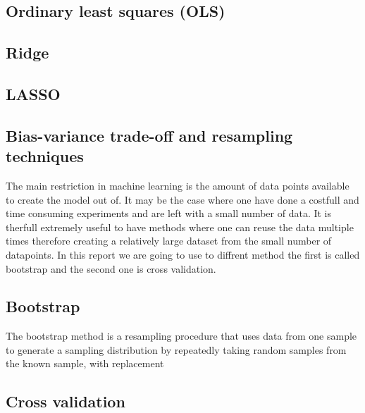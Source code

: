 \thispagestyle{plain}

\subsection{Ordinary least squares (OLS)}
\subsection{Ridge}
\subsection{LASSO}


\subsection{Bias-variance trade-off and resampling techniques}

\noindent The main restriction in machine learning is 
the amount of data points available to create the model out of. It may be the case where one have
done a costfull and time consuming experiments and are left with a small number of data. 
It is therfull extremely useful to have methods where one can reuse the data multiple times
therefore creating a relatively large dataset from the small number of datapoints. In this report
we are going to use to diffrent method the first is called bootstrap and the second one is cross validation.

\subsection{Bootstrap} 
\noindent The bootstrap method is a resampling procedure that uses data from one 
sample to generate a sampling distribution by repeatedly taking random 
samples from the known sample, with replacement\cite{PSU} 
\subsection{Cross validation}